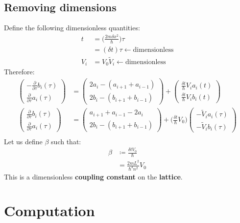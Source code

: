 \documentclass[11pt,letterpaper]{article}
\begin{document}
	\subsection{Removing dimensions}
	Define the following dimensionless quantities:
	\begin{align*}
		t&=\Big( \frac{2m\delta x^2}{\hbar} \Big) \tau\\
		&=(\delta t)\tau \leftarrow \text{dimensionless}\\
		V_i&=V_0 \widetilde{V}_i \leftarrow \text{dimensionless}
	\end{align*}
	Therefore:
	\begin{align*}
		\begin{pmatrix}
			-\frac{\partial}{\partial \tau} b_i(\tau) \\
			\frac{\partial}{\partial \tau} a_i(\tau)
		\end{pmatrix}
		&=
		\begin{pmatrix}
			2a_i-(a_{i+1}+a_{i-1}) \\
			2b_i-(b_{i+1}+b_{i-1})
		\end{pmatrix}
		+
		\begin{pmatrix}
			\frac{\delta t}{\hbar} V_i a_i(t)\\
			\frac{\delta t}{\hbar} V_i b_i(t)
		\end{pmatrix}\\
		\begin{pmatrix}
			\frac{\partial}{\partial \tau} b_i(\tau) \\
			\frac{\partial}{\partial \tau} a_i(\tau)
		\end{pmatrix}
		&=
		\begin{pmatrix}
			a_{i+1}+a_{i-1}-2a_i\\
			2b_i-(b_{i+1}+b_{i-1})
		\end{pmatrix}
		+
		\Big( \frac{\delta t}{\hbar} V_0 \Big)
		\begin{pmatrix}
			-\widetilde{V}_i a_i(\tau) \\
			-\widetilde{V}_i b_i(\tau)
		\end{pmatrix}\\
	\end{align*}
	Let us define $\beta$ such that:
	\begin{align*}
		\beta &\coloneqq \frac{\delta t V_0}{\hbar} \\
		&=\frac{2mL^2}{\hbar^3 n^2} V_0
	\end{align*}
	This is a dimensionless \textbf{coupling constant} on the \textbf{lattice}.
	\section{Computation}
\end{document}
